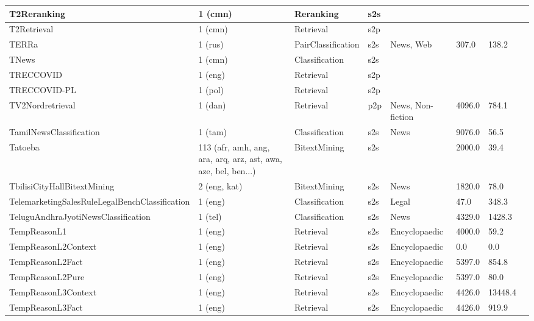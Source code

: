 \begin{longtable}{L{5.0cm}|L{1.5cm}L{1.4cm}L{1.4cm}L{1.4cm}L{1.4cm}L{1.0cm}L{1.0cm}}
 \hline 
T2Reranking \cite{xie2023t2ranking} & 1 (cmn) & Reranking & s2s &  &  &  \\
 \hline 
T2Retrieval \cite{xie2023t2ranking} & 1 (cmn) & Retrieval & s2p &  &  &  \\
 \hline 
TERRa \cite{shavrina2020russiansuperglue} & 1 (rus) & PairClassification & s2s & News, Web & 307.0 & 138.2 \\
 \hline 
TNews \cite{xu-etal-2020-clue} & 1 (cmn) & Classification & s2s &  &  &  \\
 \hline 
TRECCOVID \cite{roberts2021searching} & 1 (eng) & Retrieval & s2p &  &  &  \\
 \hline 
TRECCOVID-PL \cite{wojtasik2024beirpl} & 1 (pol) & Retrieval & s2p &  &  &  \\
 \hline 
TV2Nordretrieval \cite{flansmose-mikkelsen-etal-2022-ddisco} & 1 (dan) & Retrieval & p2p & News, Non-fiction & 4096.0 & 784.1 \\
 \hline 
TamilNewsClassification \cite{kunchukuttan2020indicnlpcorpus} & 1 (tam) & Classification & s2s & News & 9076.0 & 56.5 \\
 \hline 
Tatoeba \cite{tatoeba} & 113 (afr, amh, ang, ara, arq, arz, ast, awa, aze, bel, ben...) & BitextMining & s2s &  & 2000.0 & 39.4 \\
 \hline 
TbilisiCityHallBitextMining  & 2 (eng, kat) & BitextMining & s2s & News & 1820.0 & 78.0 \\
 \hline 
TelemarketingSalesRuleLegalBenchClassification \cite{guha2023legalbench} & 1 (eng) & Classification & s2s & Legal & 47.0 & 348.3 \\
 \hline 
TeluguAndhraJyotiNewsClassification  & 1 (tel) & Classification & s2s & News & 4329.0 & 1428.3 \\
 \hline 
TempReasonL1 \cite{xiao2024rar} & 1 (eng) & Retrieval & s2s & Encyclopaedic & 4000.0 & 59.2 \\
 \hline 
TempReasonL2Context \cite{xiao2024rar} & 1 (eng) & Retrieval & s2s & Encyclopaedic & 0.0 & 0.0 \\
 \hline 
TempReasonL2Fact \cite{xiao2024rar} & 1 (eng) & Retrieval & s2s & Encyclopaedic & 5397.0 & 854.8 \\
 \hline 
TempReasonL2Pure \cite{xiao2024rar} & 1 (eng) & Retrieval & s2s & Encyclopaedic & 5397.0 & 80.0 \\
 \hline 
TempReasonL3Context \cite{xiao2024rar} & 1 (eng) & Retrieval & s2s & Encyclopaedic & 4426.0 & 13448.4 \\
 \hline 
TempReasonL3Fact \cite{xiao2024rar} & 1 (eng) & Retrieval & s2s & Encyclopaedic & 4426.0 & 919.9 \\

\end{longtable}
